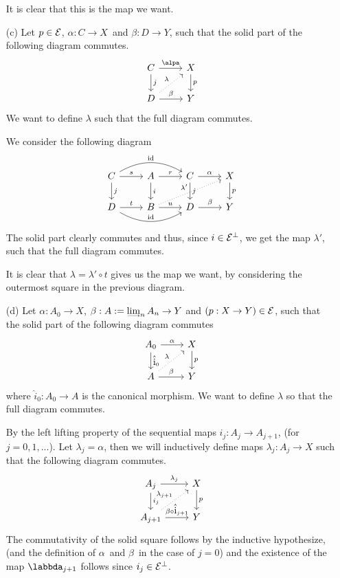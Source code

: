 \begin{exercise}[1]
\begin{enumerate}
It is clear that this is the map we want.
\item[(c)]
Let $p\in \mathcal{E}$, $\alpha: C \to X$ and $\beta: D \to Y$, such that the solid
part of the following diagram commutes.
\[ \begin{tikzcd}
C \ar[r,"\alpa"] \ar[d, "j"] 
& X \ar[d, "p"] \\
D \ar[r, "\beta"] \ar[ru, dotted, "\lambda"]
& Y
\end{tikzcd} \]
We want to define $\lambda$ such that the full diagram commutes.

We consider the following diagram
\[ \begin{tikzcd}
C \ar[r, "s"] \ar[rr, bend left, "\id"] \ar[d, "j"]
& A \ar[r, "r"] \ar[d, "i"] 
& C \ar[r, "\alpha"] \ar[d, "j"]
& X \ar[d, "p"] 
\\
D \ar[r, "t"] \ar[rr, bend right, "\id"] 
& B \ar[r, "u"] \ar[rru, dotted, "\lambda'"] 
& D \ar[r, "\beta"]
& Y
\end{tikzcd} \]
The solid part clearly commutes and thus, since $i\in \mathcal{E}^\bot$, we get the
map $\lambda'$, such that the full diagram commutes.

It is clear that $\lambda = \lambda' \circ t$ gives us the map we want, by
considering the outermost square in the previous diagram.

\item[(d)]
Let $\alpha : A_0 \to X$, $\beta : A:=\colim_n A_n \to Y$ and $(p : X \to Y)
\in \mathcal{E}$, such that the solid part of the following diagram commutes
\[ \begin{tikzcd}
A_0 \ar[r,"\alpha"] \ar[d, "\hat i_0"] 
& X \ar[d, "p"] \\
A \ar[r, "\beta"] \ar[ru, dotted, "\lambda"]
& Y
\end{tikzcd} \]
where $\hat i_0 : A_0 \to A$ is the canonical morphism.
We want to define $\lambda$ so that the full diagram commutes.

By the left lifting property of the sequential maps $i_j : A_j \to A_{j+1}$,
(for $j= 0,1,...$). Let $\lambda_j = \alpha$, then we will inductively define
maps $\lambda_j : A_j \to X$ such that the following diagram commutes.
\[ \begin{tikzcd}
A_j \ar[r,"\lambda_j"] \ar[d, "i_j"] 
& X \ar[d, "p"] \\
A_{j+1} \ar[r, "\beta \circ \hat i_{j+1}"] \ar[ru, dotted, "\lambda_{j+1}"]
& Y
\end{tikzcd} \]
The commutativity of the solid square follows by the inductive hypothesize,
(and the definition of $\alpha$ and $\beta$ in the case of $j=0$) and the existence
of the map $\labbda_{j+1}$ follows since $i_j \in \mathcal{E}^\bot$. 


\end{enumerate}
\end{exercise}
